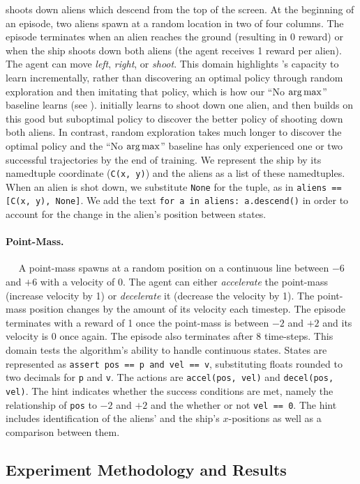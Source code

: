 \documentclass{article}
\newcommand\NoArgMax{``No $\argmax$''}
\begin{document}
shoots down aliens which descend from the top of the screen. At the beginning
of an episode, two aliens spawn at a random location in two of four columns.
The episode terminates when  an alien reaches the ground (resulting in 0
reward) or when the ship shoots down both aliens (the agent receives 1 reward
per alien). The agent can move \emph{left}, \emph{right}, or \emph{shoot}.
This domain highlights \Algorithm{}'s capacity to learn incrementally, rather
than discovering an optimal policy through random exploration and then
imitating that policy, which is how our \NoArgMax{} baseline learns (see
). \Algorithm{} initially learns to shoot down one
alien, and then builds on this good but suboptimal policy to discover the
better policy of shooting down both aliens. In contrast, random exploration
takes much longer to discover the optimal policy and the \NoArgMax{} baseline
has only experienced one or two successful trajectories by the end of
training.
We represent the ship by its namedtuple coordinate (\texttt{C(x, y)}) and the
aliens as a list of these namedtuples. When an alien is shot down, we substitute
\texttt{None} for the tuple, as in \texttt{aliens == [C(x, y), None]}. We add
the text \texttt{for a in aliens: a.descend()} in order to account for the
change in the alien's position between states.
\paragraph{Point-Mass.}~~ A point-mass spawns at a random position on a
continuous line between $-6$ and $+6$ with a velocity of 0. The agent can either
\emph{accelerate} the point-mass (increase velocity by 1) or \emph{decelerate}
it (decrease the velocity by 1). The point-mass position changes by the amount
of its velocity each timestep. The episode terminates with a reward of 1
once the point-mass is between $-2$ and $+2$ and its velocity is 0 once again.
The episode also terminates after 8 time-steps. This domain tests the
algorithm's ability to handle continuous states.
States are represented as \texttt{assert pos == p and vel == v}, substituting
floats rounded to two decimals for \texttt{p} and \texttt{v}. The actions
are \texttt{accel(pos, vel)} and \texttt{decel(pos, vel)}. The hint
indicates whether the success conditions are met, namely the relationship
of \texttt{pos} to $-2$ and $+2$ and the whether or not \texttt{vel == 0}.
The hint includes identification of the aliens' and the ship's $x$-positions
as well as a comparison between them.
\subsection{Experiment Methodology and Results}
\end{document}
